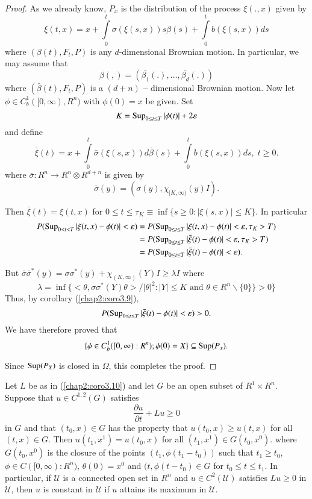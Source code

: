 \begin{proof}
As we already know, $P_x$ is the distribution of the process
$\xi(.,x)$ given by 
$$
\xi(t, x)=x+\int\limits_0^t \sigma(\xi (s,
x))s\beta(s)+\int\limits_0^t b(\xi(s, x))ds 
$$
where $(\beta(t), F_t, P)$ is any $d$-dimensional Brownian motion. In
particular, we may assume that 
$$
\beta(,)=(\bar{\beta_1}(.),\ldots,\bar{\beta_d}(.))
$$\pageoriginale
where $(\bar{\beta}(t), F_t, P)$ is a $(d+n)-$dimensional Brownian
motion. Now let $\phi \in C_b^1([0, \infty), R^n)$ with $\phi(0)=x$ be
  given. Set 
$$
K=\operatorname{Sup}_{0 \leq t \leq T}|\phi (t)|+2 \varepsilon 
$$
and define
$$
\bar{\xi}(t)=x+\int\limits_0^t \bar{\sigma}(\xi(s,
x))d\bar{\beta}(s)+\int\limits_0^t b(\xi(s, x))ds, \; t \geq 0.
$$
where $\bar{\sigma}: R^n \to R^n \otimes R^{d+n}$ is given by 
$$
\bar{\sigma}(y)=(\sigma(y),\chi_{[K, \infty)}(y)I). 
$$

Then $\bar{\xi}(t)=\xi(t, x)$ for $0 \leq t \leq \tau_K \equiv \inf
\{s \geq 0:|\xi(s,x)|\leq K \}$. In particular
{\fontsize{10pt}{12pt}\selectfont
\begin{align*}
P(\operatorname{Sup}_{0 < t < T}| \xi(t, x)-\phi(t)|<\varepsilon) &=P(\operatorname{Sup}_{0 \leq t
  \leq T}|\xi (t, x)-\phi (t)|<\varepsilon, \tau_K > T)\\ 
&=P(\operatorname{Sup}_{0 \leq t \leq T}|\bar{\xi}(t)-\phi(t)|<\varepsilon, \tau_K > T)\\
&=P(\operatorname{Sup}_{0 \leq t \leq T}|\bar{\xi}(t)-\phi(t)|<\varepsilon).
\end{align*}}\relax

But $\bar{\sigma} \bar{\sigma}^* (y)=\sigma\sigma^*(y)+\chi_{(K,
    \infty)}(Y)I \geq \lambda I$ where 
$$
\lambda= \inf \{< \theta,\sigma\sigma^*(Y)\theta > /
|\theta|^2:|Y|\leq K \text{ and } \theta \in R^n \backslash \{0\}\} > 0\} 
$$
Thus, by corollary (\ref{chap2:coro3.9}), 
$$
P(\operatorname{Sup}_{0 \leq t \leq T}|\bar{\xi}(t)-\phi(t)| < \varepsilon)>0.
$$
We have therefore proved that 
$$
\{\phi \in C_b^1([0, \infty):R^n); \phi(0)=X \} \subseteq \operatorname{Sup} (P_x). 
$$\pageoriginale

Since $\operatorname{Sup}(P_X)$ is closed in $\Omega$, this completes the proof. 
\end{proof}

\begin{coro}\label{chap2:coro3.11}%
 Let $L$ be as in (\ref{chap2:coro3.10}) and let $G$ 
  be an open subset of $R^1 \times R^n$. Suppose that $u \in
  C^{1,2}(G)$ satisfies 
$$
\frac{\partial u}{\partial t}+L u \geq 0
$$
in $G$ and that $(t_0, x)\in G$ has the property that $u(t_0, x)\geq
u(t, x)$ for all $(t, x)\in G$. Then $u(t_1, x^1)=u(t_0, x)$ for all
$(t_1, x^1)\in G(t_0, x^0)$. where $G(t_0, x^0)$ is the closure of the
points $(t_1, \phi(t_1-t_0))$ such that $t_1 \geq t_0$, $\phi \in C([0,
  \infty): R^n)$, $\theta(0)=x^0$ and $(t, \phi(t-t_0)\in G$ for $t_0
  \leq t \leq t_1$. In particular, if $\mathcal{U}$ is a connected open set in
  $R^n$ and $u \in C^2(\mathcal{U})$ satisfies $Lu \geq 0$ in
  $\mathcal{U}$, then $u$ is   constant in $\mathcal{U}$ if $u$ attains its
  maximum in $\mathcal{U}$.  
\end{coro}


